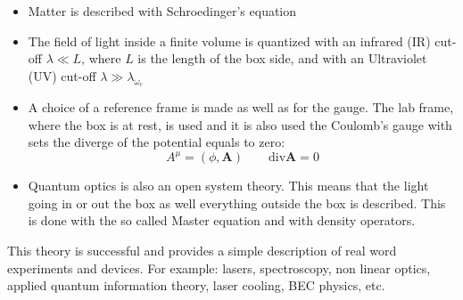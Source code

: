 \documentclass[12pt]{article}
\theoremstyle{plain}
\theoremstyle{definition}
\theoremstyle{remark}
\begin{document}
\begin{itemize}
\item Matter is described with Schroedinger's equation
\item The field of light inside a finite volume is quantized with an infrared (IR) cut-off $\lambda \ll L$, where $L$ is the length of the box side, and with an Ultraviolet (UV) cut-off  $\lambda \gg \lambda_{\omega_{c}}$
\item A choice of a reference frame is made as well as for the gauge. The lab frame, where the box is at rest, is used and it is also used the Coulomb's gauge with sets the diverge of the potential equals to zero:
\begin{equation}A^\mu = (\phi, \mathbf{A}) \qquad \text{div}\textbf{A} = 0\end{equation}
\item Quantum optics is also an open system theory. This means that the light going in or out the box as well everything outside the box is described. This is done with the so called Master equation and with density operators.
\end{itemize}
This theory is successful and provides a simple description of real word experiments and devices. For example: lasers, spectroscopy, non linear optics, applied quantum information theory, laser cooling, BEC physics, etc.
\end{document}
